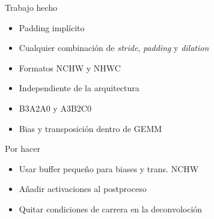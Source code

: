 \documentclass[aspectratio=43]{beamer}
\begin{document}
\begin{frame}
    \begin{block}{Trabajo hecho}
    \begin{itemize}
        \item Padding implícito
        \item Cualquier combinación de \emph{stride}, \emph{padding} y \emph{dilation}
        \item Formatos NCHW y NHWC
        \item Independiente de la arquitectura
        \item B3A2A0 y A3B2C0
        \item Bias y transposición dentro de GEMM
    \end{itemize}
    \end{block}

    \begin{block}{Por hacer}
    \begin{itemize}
        \item Usar buffer pequeño para biases y trans. NCHW
        \item Añadir activaciones al postproceso
        \item Quitar condiciones de carrera en la deconvoloción
    \end{itemize}
    \end{block}
\end{frame}
\end{document}
